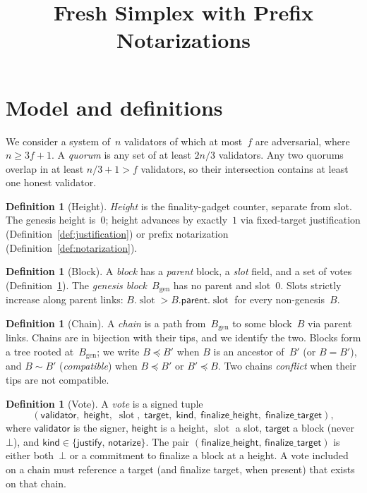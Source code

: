 \documentclass{article}
\title{Fresh Simplex with Prefix Notarizations}
\newcommand{\genesis}{\ensuremath{B_{\mathrm{gen}}}}
\newcommand{\slot}[0]{\ensuremath{\operatorname{\mathrm{slot}}}}
\newcommand{\target}{\mathsf{target}}
\newcommand{\kind}{\mathsf{kind}}
\newcommand{\height}{\mathsf{height}}
\newcommand{\validator}{\mathsf{validator}}
\newcommand{\just}{\ensuremath{\mathsf{justify}}\xspace}
\newcommand{\notar}{\ensuremath{\mathsf{notarize}}\xspace}
\newcommand{\parent}{\mathsf{parent}}
\newcommand{\finalizeHeight}{\mathsf{finalize\_height}}
\newcommand{\finalizeTarget}{\mathsf{finalize\_target}}
\theoremstyle{plain}
\theoremstyle{definition}
\newtheorem{definition}[theorem]{Definition}
\theoremstyle{remark}
\begin{document}
\maketitle

\section{Model and definitions}

We consider a system of~$n$ validators of which at most~$f$ are adversarial, where $n \geq 3f + 1$.
A \emph{quorum} is any set of at least $2n/3$ validators.
Any two quorums overlap in at least $n/3 + 1 > f$ validators, so their intersection contains at least one honest validator.

\begin{definition}[Height]\label{def:height}
\emph{Height} is the finality-gadget counter, separate from slot.
The genesis height is~$0$; height advances by exactly~$1$ via fixed-target justification (Definition~\ref{def:justification}) or prefix notarization (Definition~\ref{def:notarization}).
\end{definition}

\begin{definition}[Block]\label{def:block}
A \emph{block} has a \emph{parent} block, a \emph{slot} field, and a set of votes (Definition~\ref{def:vote}).
The \emph{genesis block}~$\genesis$ has no parent and slot~$0$.
Slots strictly increase along parent links: $B.\slot > B.\parent.\slot$ for every non-genesis~$B$.
\end{definition}

\begin{definition}[Chain]\label{def:chain}
A \emph{chain} is a path from~$\genesis$ to some block~$B$ via parent links.
Chains are in bijection with their tips, and we identify the two.
Blocks form a tree rooted at~$\genesis$; we write $B \preceq B'$ when $B$ is an ancestor of~$B'$ (or $B = B'$), and $B \sim B'$ (\emph{compatible}) when $B \preceq B'$ or $B' \preceq B$.
Two chains \emph{conflict} when their tips are not compatible.
\end{definition}

\begin{definition}[Vote]\label{def:vote}
A \emph{vote} is a signed tuple
\[
  (\validator,\; \height,\; \slot,\; \target,\; \kind,\; \finalizeHeight,\; \finalizeTarget),
\]
where $\validator$ is the signer, $\height$ is a height, $\slot$ a slot, $\target$ a block (never~$\bot$), and $\kind \in \{\just,\, \notar\}$.
The pair $(\finalizeHeight,\, \finalizeTarget)$ is either both~$\bot$ or a commitment to finalize a block at a height.
A vote included on a chain must reference a target (and finalize target, when present) that exists on that chain.
\end{definition}
\end{document}
